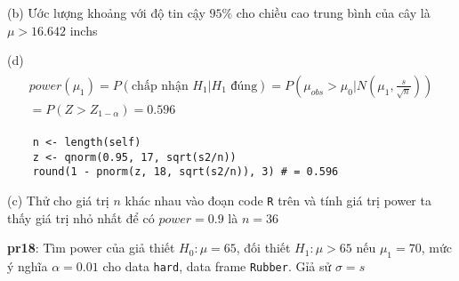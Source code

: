 (b) Ước lượng khoảng với độ tin cậy $95\%$ cho chiều cao trung bình của cây là $\mu > 16.642$ inchs





(d) 
\begin{align*}
    \begin{split}
        power(\mu_1) = P(\text{chấp nhận } H_1 | H_1 \text{ đúng}) = P\left(\mu_{obs} > \mu_0 | N\left(\mu_1, \frac{s}{\sqrt{n}}\right)\right) \\
        = P\left( Z > Z_{1 - \alpha} \right) = 0.596
    \end{split}
\end{align*}

\begin{lstlisting}
    n <- length(self)
    z <- qnorm(0.95, 17, sqrt(s2/n))
    round(1 - pnorm(z, 18, sqrt(s2/n)), 3) # = 0.596
\end{lstlisting}

(c)
Thử cho giá trị $n$ khác nhau vào đoạn code \lstinline{R} trên và tính giá trị power ta thấy giá trị nhỏ
nhất để có $power = 0.9$ là $n = 36$

\textbf{pr18}: Tìm power của giả thiết $H_0: \mu = 65$, đối thiết $H_1: \mu > 65$
nếu $\mu_1 = 70$, mức ý nghĩa $\alpha = 0.01$ cho data \lstinline{hard}, data frame \lstinline{Rubber}.
Gỉả sử $\sigma = s$

